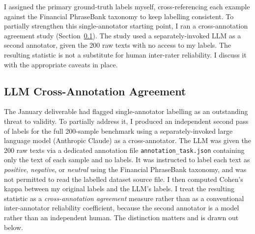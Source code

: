 I assigned the primary ground-truth labels myself, cross-referencing each example against the Financial PhraseBank taxonomy \citep{malo2014financialphrasebank} to keep labelling consistent. To partially strengthen this single-annotator starting point, I ran a cross-annotation agreement study (Section~\ref{sec:inter_annotator}). The study used a separately-invoked LLM as a second annotator, given the 200 raw texts with no access to my labels. The resulting statistic is not a substitute for human inter-rater reliability. I discuss it with the appropriate caveats in place.

\subsection{LLM Cross-Annotation Agreement}
\label{sec:inter_annotator}

The January deliverable had flagged single-annotator labelling as an outstanding threat to validity. To partially address it, I produced an independent second pass of labels for the full 200-sample benchmark using a separately-invoked large language model (Anthropic Claude) as a cross-annotator. The LLM was given the 200 raw texts via a dedicated annotation file \texttt{annotation\_task.json} containing only the text of each sample and no labels. It was instructed to label each text as \textit{positive}, \textit{negative}, or \textit{neutral} using the Financial PhraseBank taxonomy, and was not permitted to read the labelled dataset source file. I then computed Cohen's kappa \citep{cohen1960kappa} between my original labels and the LLM's labels. I treat the resulting statistic as a \emph{cross-annotation agreement} measure rather than as a conventional inter-annotator reliability coefficient, because the second annotator is a model rather than an independent human. The distinction matters and is drawn out below.

